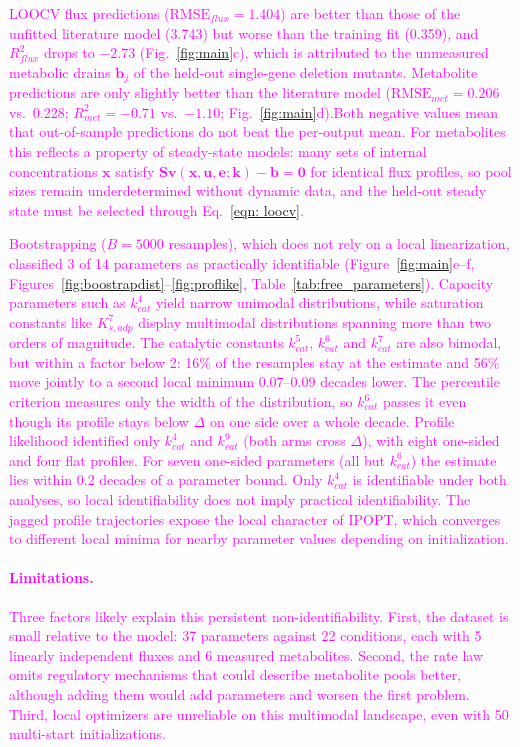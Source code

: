 \documentclass[conference]{IEEEtran}
\begin{document}
{\textcolor{magenta}{LOOCV flux predictions ($\text{RMSE}_{flux}=1.404$) are better than those of the unfitted literature model (3.743) but worse than the training fit (0.359), and $R^2_{flux}$ drops to $-2.73$ (Fig.~\ref{fig:main}c), which is attributed to the unmeasured metabolic drains $\mathbf{b}_j$ of the held-out single-gene deletion mutants. Metabolite predictions are only slightly better than the literature model ($\text{RMSE}_{met}=0.206$ vs.\ 0.228; $R^2_{met}=-0.71$ vs.\ $-1.10$; Fig.~\ref{fig:main}d).Both negative values mean that out-of-sample predictions do not beat the per-output mean. For metabolites this reflects a property of steady-state models: many sets of internal concentrations $\mathbf{x}$ satisfy $\mathbf{S}\mathbf{v}(\mathbf{x},\mathbf{u},\mathbf{e};\mathbf{k})-\mathbf{b}=\mathbf{0}$ for identical flux profiles, so pool sizes remain underdetermined without dynamic data, and the held-out steady state must be selected through Eq.~\ref{eqn: loocv}.}


\textcolor{magenta}{Bootstrapping ($B=5000$ resamples), which does not rely on a local linearization, classified 3 of 14 parameters as practically identifiable (Figure~\ref{fig:main}e--f, Figures~\ref{fig:boostrapdist}--\ref{fig:proflike}, Table~\ref{tab:free_parameters}).  Capacity parameters such as $k_{cat}^{4}$ yield narrow unimodal distributions, while saturation constants like $K_{s,adp}^7$ display multimodal distributions spanning more than two orders of magnitude. The catalytic constants $k^5_{cat}$, $k^6_{cat}$ and $k^7_{cat}$ are also bimodal, but within a factor below 2: 16\% of the resamples stay at the estimate and 56\% move jointly to a second local minimum 0.07--0.09 decades lower. The percentile criterion measures only the width of the distribution, so $k^6_{cat}$ passes it even though its profile stays below $\Delta$ on one side over a whole decade. Profile likelihood identified only $k^{4}_{cat}$ and $k^{9}_{cat}$ (both arms cross $\Delta$), with eight one-sided and four flat profiles. For seven one-sided parameters (all but $k^6_{cat}$) the estimate lies within 0.2 decades of a parameter bound. Only $k^{4}_{cat}$ is identifiable under both analyses, so local identifiability does not imply practical identifiability. The jagged profile trajectories expose the local character of IPOPT, which converges to different local minima for nearby parameter values depending on initialization.}
\textcolor{magenta}{\paragraph{Limitations.} Three factors likely explain this persistent non-identifiability. First, the dataset is small relative to the model: 37 parameters against 22 conditions, each with 5 linearly independent fluxes and 6 measured metabolites. Second, the rate law omits regulatory mechanisms that could describe metabolite pools better, although adding them would add parameters and worsen the first problem. Third, local optimizers are unreliable on this multimodal landscape, even with 50 multi-start initializations.}

}
\end{document}
